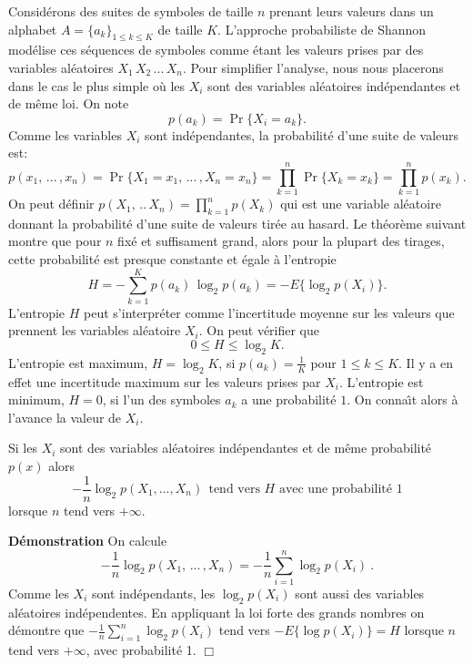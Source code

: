 Consid\'erons des suites de symboles de taille $n$ prenant leurs
valeurs dans un alphabet $A = \{a_k \}_{1 \leq k \leq K}$ 
de taille $K$. 
L'approche probabiliste de Shannon mod\'elise
ces s\'equences de symboles comme \'etant les valeurs prises
par des variables al\'eatoires $X_1\, X_2\,...\, X_n$.
Pour simplifier l'analyse, nous nous placerons dans le cas le
plus simple o\`u les $X_i$ sont des variables al\'eatoires
ind\'ependantes et de m\^eme loi. On note
\[
p(a_k) = \Pr \{ X_i = a_k \} .
\]
Comme les variables $X_i$ sont ind\'ependantes, la
probabilit\'e d'une suite de valeurs est:
\[
p(x_1,\, ...\,, x_n) = \Pr \{X_1 = x_1 ,\, ...\, , X_n = x_n \} =
\prod_{k=1}^n \Pr \{X_k = x_k \} = \prod_{k=1}^n p(x_k) .
\]
On peut d\'efinir $p(X_1 ,\, ..\, X_n) = \prod_{k=1}^n p(X_k)$
qui est une variable al\'eatoire donnant la probabilit\'e 
d'une suite de valeurs tir\'ee au hasard.
Le th\'eor\`eme suivant montre que pour $n$ fix\'e
et suffisament grand, alors pour la plupart des
tirages, cette probabilit\'e est presque constante et
\'egale \`a l'entropie
\[
H = - \sum_{k=1}^K p(a_k)\, \log_2 p(a_k) = - E\{ \log_2 p(X_i)\} .
\]
L'entropie $H$ peut s'interpr\'eter comme 
l'incertitude moyenne sur les valeurs
que prennent les variables al\'eatoire $X_i$.
On peut v\'erifier que
\[
0 \leq H \leq \log_2 K .
\]
L'entropie est maximum, $H = \log_2 K$, si 
$p(a_k) = \frac 1 K$ pour $1 \leq k \leq K$.
Il y a en effet une incertitude maximum sur les valeurs prises
par $X_i$.
L'entropie est minimum, $H = 0$, si l'un des symboles $a_k$ 
a une probabilit\'e $1$. 
On conna\^{\i}t alors \`a l'avance la valeur de $X_i$.

\begin{theorem}
\label{EquiTh}
Si les $X_i$ sont des variables al\'eatoires ind\'ependantes
et de m\^eme probabilit\'e $p(x)$ alors
\[
-\frac 1 n \log_2 p(X_1, ...,X_n)~~\mbox{tend vers $H$ avec
une probabilit\'e $1$}
\]
lorsque $n$ tend vers $+\infty$.
\end{theorem}

{\bf D\'emonstration} On calcule
\[
- \frac 1 n \log_2 p(X_1,\, ...\,, X_n) = - \frac 1 n \sum_{i=1}^n 
\log_2 p(X_i)~.
\]
Comme les $X_i$ sont ind\'ependants, les $\log_2 p(X_i)$ sont aussi
des variables al\'eatoires ind\'ependentes.
En appliquant la loi forte des grands nombres \cite{neveu}
on d\'emontre que 
$- \frac 1 n \sum_{i=1}^n \log_2 p(X_i)$ tend
vers $- E\{ \log p(X_i)\} = H$ lorsque $n$ tend vers $+\infty$,
avec probabilit\'e 1. $\Box$

